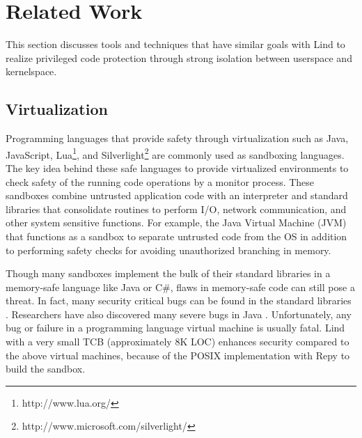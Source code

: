 \section{Related Work}
\label{sec.related_work}

This section discusses tools and techniques that have similar goals with Lind to realize privileged code protection through strong isolation between userspace and kernelspace.

	
\subsection{Virtualization}

Programming languages that provide safety through virtualization such as Java, JavaScript, Lua\footnote{http://www.lua.org/}, and Silverlight\footnote{http://www.microsoft.com/silverlight/} are commonly used as sandboxing languages. The key idea behind these safe languages to provide virtualized environments to check safety of the running code operations by a monitor process. These sandboxes combine untrusted application code with an interpreter and standard libraries that consolidate routines to perform I/O, network communication, and other system sensitive functions. For example, the Java Virtual Machine (JVM) that functions as a sandbox to separate untrusted code from the OS in addition to performing safety checks for avoiding unauthorized branching in memory.

Though many sandboxes implement the bulk of their standard libraries in a memory-safe language like Java or C\#, flaws in memory-safe code can still pose a threat. In fact, many security critical bugs can be found in the standard libraries \cite{JavaBugs}. Researchers have also discovered many severe bugs in Java \cite{Java-Lessons}. Unfortunately, any bug or failure in a programming language virtual machine is usually fatal. Lind with a very small TCB (approximately 8K LOC) enhances security compared to the above virtual machines,  because of the POSIX implementation with Repy to build the sandbox.

